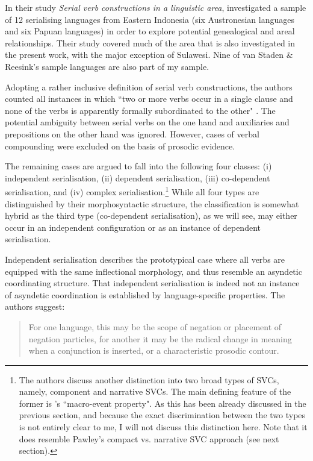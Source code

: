 In their study \textit{Serial verb constructions in a linguistic area}, \citet{vanstaden2008serial} investigated a sample of 12 serialising languages from Eastern Indonesia (six Austronesian languages and six Papuan languages) in order to explore potential genealogical and areal relationships. Their study covered much of the area that is also investigated in the present work, with the major exception of Sulawesi. Nine of van Staden \& Reesink's sample languages are also part of my sample. 

Adopting a rather inclusive definition of serial verb constructions, the authors counted all instances in which ``two or more verbs occur in a single clause and none of the verbs is apparently formally subordinated to the other" \citep[22]{vanstaden2008serial}. The potential ambiguity between serial verbs on the one hand and auxiliaries and prepositions on the other hand was ignored. However, cases of verbal compounding were excluded on the basis of prosodic evidence. 

The remaining cases are argued to fall into the following four classes: (i) independent serialisation, (ii) dependent serialisation, (iii) co-dependent serialisation, and (iv) complex serialisation.\footnote{The authors discuss another distinction into two broad types of SVCs, namely, component and narrative SVCs. The main defining feature of the former is \citeauthor{bohnemeyer2007principles}'s ``macro-event property". As this has been already discussed in the previous section, and because the exact discrimination between the two types is not entirely clear to me, I will not discuss this distinction here. Note that it does resemble Pawley's compact vs. narrative SVC approach (see next section).} While all four types are distinguished by their morphosyntactic structure, the classification is somewhat hybrid as the third type (co-dependent serialisation), as we will see, may either occur in an independent configuration or as an instance of dependent serialisation.

Independent serialisation describes the prototypical case where all verbs are equipped with the same inflectional morphology, and thus resemble an asyndetic coordinating structure. That independent serialisation is indeed not an instance of asyndetic coordination is established by language-specific properties. The authors suggest:

\begin{quote}For one language, this may be the scope of negation or placement of negation particles, for another it may be the radical change in meaning when a conjunction is inserted, or a characteristic prosodic contour. \citep[23]{vanstaden2008serial}\end{quote}

